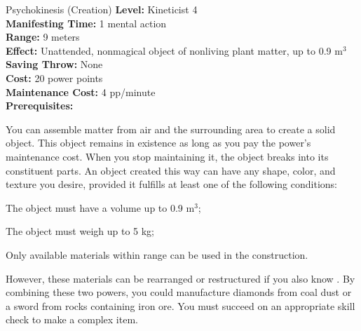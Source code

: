 {Psychokinesis (Creation)}
{
	\textbf{Level:}
	Kineticist 4\\
	\textbf{Manifesting Time:}
	1 mental action\\
	\textbf{Range:}
	9 meters\\
	\textbf{Effect:}
	Unattended, nonmagical object of nonliving plant matter, up to 0.9 m$^3$\\
	\textbf{Saving Throw:}
	None\\
	\textbf{Cost:}
	20 power points\\
	\textbf{Maintenance Cost:}
	4 pp/minute\\
	\textbf{Prerequisites:}
	\\
}
{
	You can assemble matter from air and the surrounding area to create a solid object. This object remains in existence as long as you pay the power's maintenance cost. When you stop maintaining it, the object breaks into its constituent parts. An object created this way can have any shape, color, and texture you desire, provided it fulfills at least one of the following conditions:
	\begin{enumerate*}
	\item The object must have a volume up to 0.9 m$^3$;
	\item The object must weigh up to 5 kg;
	\item Only available materials within range can be used in the construction.
	\end{enumerate*}

	However, these materials can be rearranged or restructured if you also know . By combining these two powers, you could manufacture diamonds from coal dust or a sword from rocks containing iron ore. You must succeed on an appropriate skill check to make a complex item.
}